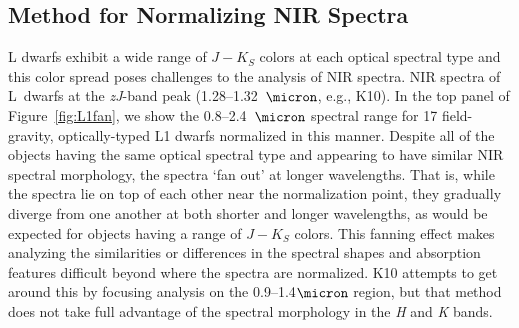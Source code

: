 \documentclass[modern]{aastex61}
\begin{document}
\subsection{Method for Normalizing NIR Spectra}
\label{sec:method}
L dwarfs exhibit a wide range of $J-K_S$ colors at each optical spectral type \cite[e.g.,][]{Kirkpatrick08, Schmidt10, Faherty:2012cy} and this color spread poses challenges to the analysis of NIR spectra.
 NIR spectra of L~dwarfs at the \emph{zJ}-band peak (1.28--1.32~$\micron$, e.g., K10).
In the top panel of Figure~\ref{fig:L1fan}, we show the 0.8--2.4~$\micron$ spectral range for 17 field-gravity, optically-typed L1 dwarfs normalized in this manner.
Despite all of the objects having the same optical spectral type and appearing to have similar NIR spectral morphology, the spectra `fan out' at longer wavelengths.
That is, while the spectra lie on top of each other near the normalization point, they gradually diverge from one another at both shorter and longer wavelengths, as would be expected for objects having a range of $J-K_S$ colors.
This fanning effect makes analyzing the similarities or differences in the spectral shapes and absorption features difficult beyond where the spectra are normalized.
K10 attempts to get around this by focusing analysis on the 0.9--1.4$\micron$ region, but that method does not take full advantage of the spectral morphology in the \emph{H} and \emph{K} bands.
\end{document}
